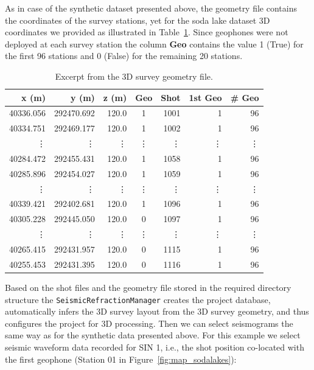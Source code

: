\documentclass[a4paper,fleqn]{cas-sc}
\begin{document}
As in case of the synthetic dataset presented above, the geometry file contains the coordinates of the survey stations, yet for the soda lake dataset 3D coordinates we provided as illustrated in Table~\ref{tab:3d_geometry}. 
Since geophones were not deployed at each survey station the column \textbf{Geo} contains the value 1 (True) for the first 96 stations and 0 (False) for the remaining \num{20} stations. 
\begin{table}
   \caption{Excerpt from the 3D survey geometry file.}
    \centering
    \begin{tabular}{rrrcrrr}
        \toprule
        \textbf{x (m)} & \textbf{y (m)} & \textbf{z (m)} & \textbf{Geo} & \textbf{Shot} & \textbf{1st Geo} & \textbf{\# Geo} \\
        \midrule
        40336.056 & 292470.692 & 120.0 & 1 & 1001	 & 1 & 96 \\
        40334.751 & 292469.177 & 120.0 & 1 & 1002 & 	1 & 96 \\
        \vdots & \vdots & \vdots & \vdots & \vdots & \vdots & \vdots \\
		40284.472 & 292455.431 & 120.0 & 1 & 1058 & 1 & 96 \\
		40285.896 & 292454.027 & 120.0 & 1 & 1059 & 1 & 96 \\
        \vdots & \vdots & \vdots & \vdots & \vdots & \vdots & \vdots \\
        40339.421 & 292402.681 & 120.0 & 1 & 1096 & 1 & 96 \\
		40305.228 & 292445.050 & 120.0 & 0 & 1097 & 1 & 96 \\
        \vdots & \vdots & \vdots & \vdots & \vdots & \vdots & \vdots \\
        40265.415 & 292431.957 & 120.0 & 0 & 1115 & 1 & 96 \\
		40255.453 & 292431.395 & 120.0 & 0 & 1116 & 1 & 96 \\
        \bottomrule
    \end{tabular}
    \label{tab:3d_geometry}
\end{table}
Based on the shot files and the geometry file stored in the required directory structure the \texttt{SeismicRefractionManager} creates the project database, automatically infers the 3D survey layout from the 3D survey geometry, and thus configures the project for 3D processing. Then we can select seismograms the same way as for the synthetic data presented above. For this example we select seismic waveform data recorded for SIN 1, i.e., the shot position co-located with the first geophone (Station 01 in Figure~\ref{fig:map_sodalakes}):
\end{document}
